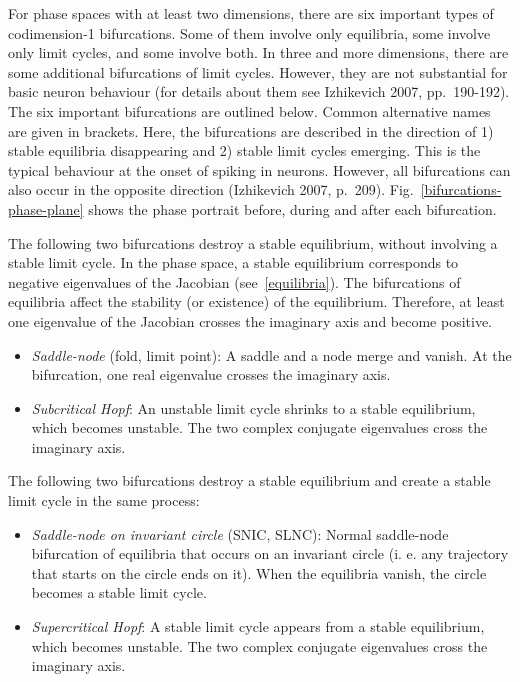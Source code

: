 \documentclass[12pt,a4paper,]{report}
\begin{document}
For phase spaces with at least two dimensions, there are six important
types of codimension-1 bifurcations. Some of them involve only
equilibria, some involve only limit cycles, and some involve both. In
three and more dimensions, there are some additional bifurcations of
limit cycles. However, they are not substantial for basic neuron
behaviour (for details about them see Izhikevich 2007, pp.~190-192). The
six important bifurcations are outlined below. Common alternative names
are given in brackets. Here, the bifurcations are described in the
direction of 1) stable equilibria disappearing and 2) stable limit
cycles emerging. This is the typical behaviour at the onset of spiking
in neurons. However, all bifurcations can also occur in the opposite
direction (Izhikevich 2007, p.~209). Fig.~\ref{bifurcations-phase-plane}
shows the phase portrait before, during and after each bifurcation.

The following two bifurcations destroy a stable equilibrium, without
involving a stable limit cycle. In the phase space, a stable equilibrium
corresponds to negative eigenvalues of the Jacobian
(see~\ref{equilibria}). The bifurcations of equilibria affect the
stability (or existence) of the equilibrium. Therefore, at least one
eigenvalue of the Jacobian crosses the imaginary axis and become
positive.

\begin{itemize}
\item
  \emph{Saddle-node} (fold, limit point): A saddle and a node merge and
  vanish. At the bifurcation, one real eigenvalue crosses the imaginary
  axis.
\item
  \emph{Subcritical Hopf}: An unstable limit cycle shrinks to a stable
  equilibrium, which becomes unstable. The two complex conjugate
  eigenvalues cross the imaginary axis.
\end{itemize}

The following two bifurcations destroy a stable equilibrium and create a
stable limit cycle in the same process:

\begin{itemize}
\item
  \emph{Saddle-node on invariant circle} (SNIC, SLNC): Normal
  saddle-node bifurcation of equilibria that occurs on an invariant
  circle (i. e. any trajectory that starts on the circle ends on it).
  When the equilibria vanish, the circle becomes a stable limit cycle.
\item
  \emph{Supercritical Hopf}: A stable limit cycle appears from a stable
  equilibrium, which becomes unstable. The two complex conjugate
  eigenvalues cross the imaginary axis.
\end{itemize}
\end{document}
